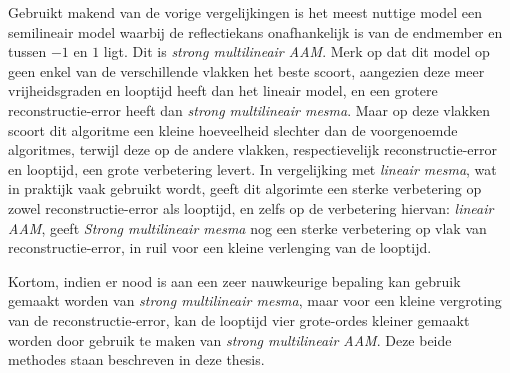 \documentclass[12pt]{report}
\begin{document}
Gebruikt makend van de vorige vergelijkingen is het meest nuttige model een semilineair model waarbij de reflectiekans onafhankelijk is van de endmember en tussen $-1$ en $1$ ligt. Dit is \textit{strong multilineair AAM}. Merk op dat dit model op geen enkel van de verschillende vlakken het beste scoort, aangezien deze meer vrijheidsgraden en looptijd heeft dan het lineair model, en een grotere reconstructie-error heeft dan \textit{strong multilineair mesma}. Maar op deze vlakken scoort dit algoritme een kleine hoeveelheid slechter dan de voorgenoemde algoritmes, terwijl deze op de andere vlakken, respectievelijk reconstructie-error en looptijd, een grote verbetering levert. In vergelijking met \textit{lineair mesma}, wat in praktijk vaak gebruikt wordt, geeft dit algorimte een sterke verbetering op zowel reconstructie-error als looptijd, en zelfs op de verbetering hiervan: \textit{lineair AAM}, geeft \textit{Strong multilineair mesma} nog een sterke verbetering op vlak van reconstructie-error, in ruil voor een kleine verlenging van de looptijd. 

Kortom, indien er nood is aan een zeer nauwkeurige bepaling kan gebruik gemaakt worden van \textit{strong multilineair mesma}, maar voor een kleine vergroting van de reconstructie-error, kan de looptijd vier grote-ordes kleiner gemaakt worden door gebruik te maken van \textit{strong multilineair AAM}. Deze beide methodes staan beschreven in deze thesis.


\begin{flushleft}
\nocite{*}
{}


\end{flushleft}
\end{document}
